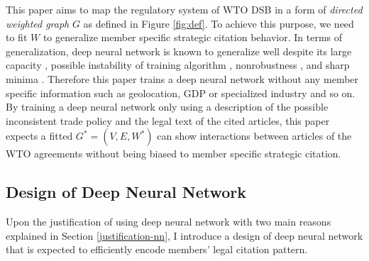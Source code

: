 \documentclass[12pt,letterpaper]{article}
\begin{document}
This paper aims to map the regulatory system of WTO DSB in a form of \textit{directed weighted graph} $G$ as defined in Figure \ref{fig:def}.
To achieve this purpose, we need to fit $W$ to generalize member specific strategic citation behavior.
In terms of generalization, deep neural network is known to generalize well despite
its large capacity \citep{neyshabur2017exploring}, possible instability of training algorithm \citep{charles2017stability}, nonrobustness \citep{zahavy2017ensemble}, and sharp minima \citep{dinh2017sharp}.
Therefore this paper trains a deep neural network without any member specific information such as geolocation, GDP or specialized industry and so on. By training a deep neural network only using a description of the possible inconsistent trade policy and the legal text of the cited articles,
this paper expects a fitted $G^{*} = (V, E, W^*)$ can show interactions between articles of the WTO agreements
without being biased to member specific strategic citation.

\subsection{Design of Deep Neural Network}
Upon the justification of using deep neural network with two main reasons explained in Section \ref{justification-nn}, %
I introduce a design of deep neural network that is expected to efficiently encode members' legal citation pattern.
\end{document}
